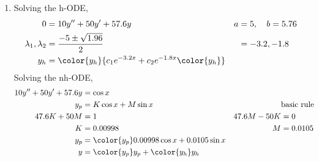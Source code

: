 \begin{enumerate}
    \item Solving the h-ODE,
          \begin{align}
              0                        & = 10y'' + 50y' + 57.6y                                      & a & = 5, \quad b = 5.76 \\
              \lambda_{1}, \lambda_{2} & = \frac{-5 \pm \sqrt{1.96}}{2}                              &   & = -3.2, -1.8        \\
              y_{h}                    & = \color{y_h} {c_{1}e^{-3.2x} + c_{2}e^{-1.8x} \color{y_h}}
          \end{align}
          Solving the nh-ODE,
          \begin{align}
              10y'' + 50y' + 57.6y & = \cos x                                                                      \\
              y_{p}                & = K\cos x + M\sin x                         &             & \text{basic rule} \\
              47.6K + 50M          & = 1                                         & 47.6M - 50K & = 0               \\
              K                    & = 0.00998                                   & M           & =  0.0105         \\
              y_{p}                & = \color{y_p} 0.00998\cos x + 0.0105 \sin x                                   \\
              y                    & = {\color{y_p} y_{p}} + {\color{y_h} y_{h}}
          \end{align}


\end{enumerate}
